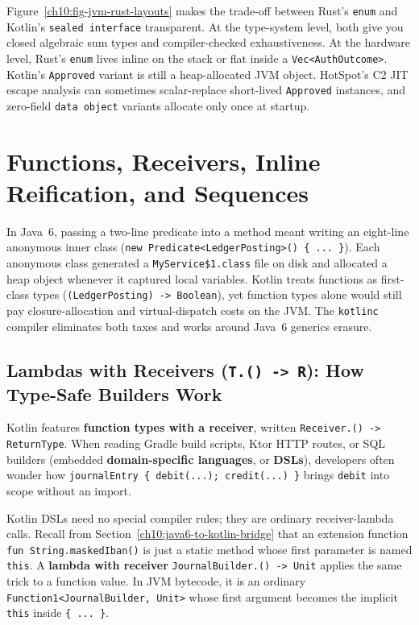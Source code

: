Figure~\ref{ch10:fig-jvm-rust-layouts} makes the trade-off between Rust's \texttt{enum} and Kotlin's \texttt{sealed interface} transparent. At the type-system level, both give you closed algebraic sum types and compiler-checked exhaustiveness. At the hardware level, Rust's \texttt{enum} lives inline on the stack or flat inside a \texttt{Vec<AuthOutcome>}. Kotlin's \texttt{Approved} variant is still a heap-allocated JVM object. HotSpot's C2 JIT escape analysis can sometimes scalar-replace short-lived \texttt{Approved} instances, and zero-field \texttt{data object} variants allocate only once at startup.

\section{Functions, Receivers, Inline Reification, and Sequences}
\label{ch10:functions-inline-reified-sequences}

In Java~6, passing a two-line predicate into a method meant writing an eight-line anonymous inner class (\texttt{new Predicate<LedgerPosting>() \{ ... \}}). Each anonymous class generated a \texttt{MyService\$1.class} file on disk and allocated a heap object whenever it captured local variables. Kotlin treats functions as first-class types (\texttt{(LedgerPosting) -> Boolean}), yet function types alone would still pay closure-allocation and virtual-dispatch costs on the JVM. The \texttt{kotlinc} compiler eliminates both taxes and works around Java~6 generics erasure.

\subsection{Lambdas with Receivers (\texttt{T.() -> R}): How Type-Safe Builders Work}

Kotlin features \textbf{function types with a receiver}, written \texttt{Receiver.() -> ReturnType}. When reading Gradle build scripts, Ktor HTTP routes, or SQL builders (embedded \textbf{domain-specific languages}, or \textbf{DSLs}), developers often wonder how \texttt{journalEntry \{ debit(...); credit(...) \}} brings \texttt{debit} into scope without an import.

Kotlin DSLs need no special compiler rules; they are ordinary receiver-lambda calls. Recall from Section~\ref{ch10:java6-to-kotlin-bridge} that an extension function \texttt{fun String.maskedIban()} is just a static method whose first parameter is named \texttt{this}. A \textbf{lambda with receiver} \texttt{JournalBuilder.() -> Unit} applies the same trick to a function value. In JVM bytecode, it is an ordinary \texttt{Function1<JournalBuilder, Unit>} whose first argument becomes the implicit \texttt{this} inside \texttt{\{ ... \}}.

